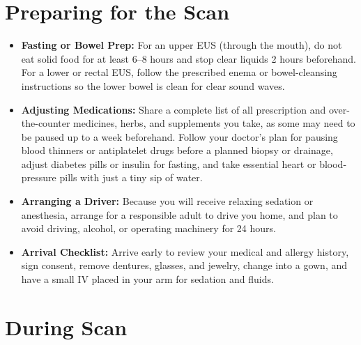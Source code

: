 \section{Preparing for the Scan}

\begin{itemize}
    \item \textbf{Fasting or Bowel Prep:} For an upper EUS (through the mouth), do not eat solid food for at least 6--8 hours and stop clear liquids 2 hours beforehand. For a lower or rectal EUS, follow the prescribed enema or bowel-cleansing instructions so the lower bowel is clean for clear sound waves.
    \item \textbf{Adjusting Medications:} Share a complete list of all prescription and over-the-counter medicines, herbs, and supplements you take, as some may need to be paused up to a week beforehand. Follow your doctor's plan for pausing blood thinners or antiplatelet drugs before a planned biopsy or drainage, adjust diabetes pills or insulin for fasting, and take essential heart or blood-pressure pills with just a tiny sip of water.
    \item \textbf{Arranging a Driver:} Because you will receive relaxing sedation or anesthesia, arrange for a responsible adult to drive you home, and plan to avoid driving, alcohol, or operating machinery for 24 hours.
    \item \textbf{Arrival Checklist:} Arrive early to review your medical and allergy history, sign consent, remove dentures, glasses, and jewelry, change into a gown, and have a small IV placed in your arm for sedation and fluids.
\end{itemize}

\section{During Scan}

